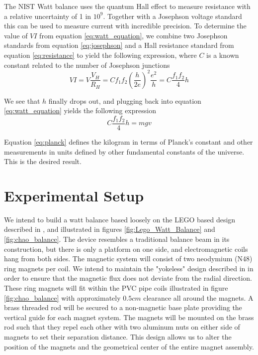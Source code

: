 \documentclass[aps,prstab,reprint,12pt]{revtex4-1}
\begin{document}
The NIST Watt balance uses the quantum Hall effect to measure resistance with a relative uncertainty of 1 in $10^9$. Together with a Josephson voltage standard this can be used to measure current with incredible precision. To determine the value of $VI$ from equation \ref{eq:watt_equation}, we combine two Josephson standards from equation \ref{eq:josephson} and a Hall resistance standard from equation \ref{eq:resistance} to yield the following expression, where $C$ is a known constant related to the number of Josephson junctions
\begin{equation}
    VI=V \frac{V_H}{R_H} = C f_1 f_2 \left(\frac{h}{2e}\right)^2 \frac{e^2}{h}=C \frac{f_1f_2}{4} h
\end{equation}

We see that $h$ finally drops out, and plugging back into equation \ref{eq:watt_equation} yields the following expression
\begin{equation}\label{eq:planck}
    C \frac{f_1f_2}{4} h = mgv
\end{equation}

Equation \ref{eq:planck} defines the kilogram in terms of Planck's constant and other measurements in units defined by other fundamental constants of the universe. This is the desired result.





\section{Experimental Setup}
We intend to build a watt balance based loosely on the LEGO based design described in \cite{Chao2015}, and illustrated in figures \ref{fig:Lego_Watt_Balance} and \ref{fig:chao_balance}. The device resembles a traditional balance beam in its construction, but there is only a platform on one side, and electromagnetic coils hang from both sides. The magnetic system will consist of two neodymium (N48) ring magnets per coil. We intend to maintain the "yokeless" design described in \cite{Chao2015} in order to ensure that the magnetic flux does not deviate from the radial direction. These ring magnets will fit within the PVC pipe coils illustrated in figure \ref{fig:chao_balance} with approximately $0.5\si{cm}$ clearance all around the magnets. A brass threaded rod will be secured to a non-magnetic base plate providing the vertical guide for each magnet system. The magnets will be mounted on the brass rod such that they repel each other with two aluminum nuts on either side of magnets to set their separation distance. This design allows us to alter the position of the magnets and the geometrical center of the entire magnet assembly. 
\end{document}
